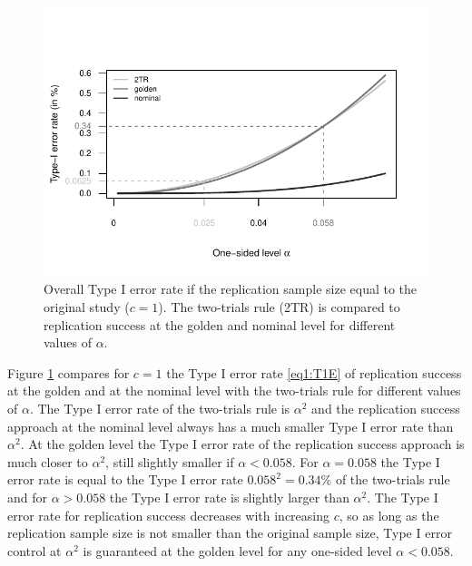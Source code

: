 \begin{figure}[!ht]
\begin{center}

\begin{knitrout}
\color{fgcolor}

{\centering \includegraphics[width=\maxwidth]{images/paper1/fig5-1}

}


\end{knitrout}

\end{center}
\caption{Overall Type I error rate if the replication sample size equal to the
  original study ($c=1$). The two-trials rule (2TR) is compared to replication
  success at the golden and nominal level for different values of $\alpha$.}
\label{fig1:fig5}
\end{figure}

Figure \ref{fig1:fig5} compares for $c=1$ the Type I error rate \eqref{eq1:T1E} of
replication success at the golden and at the nominal level with the two-trials
rule for different values of $\alpha$. The Type I error rate of the two-trials
rule is $\alpha^2$ and the replication success approach at the nominal level
always has a much smaller Type I error rate than $\alpha^2$. At the golden level
the Type I error rate of the replication success approach is much closer to
$\alpha^2$, still slightly smaller if $\alpha < 0.058$. For $\alpha = 0.058$ the
Type I error rate is equal to the Type I error rate $0.058^2 = 0.34\%$ of the
two-trials rule and for $\alpha > 0.058$ the Type I error rate is slightly
larger than $\alpha^2$. The Type I error rate for replication success decreases
with increasing $c$, so as long as the replication sample size is not smaller
than the original sample size, Type I error control at $\alpha^2$ is guaranteed
at the golden level for any one-sided level $\alpha < 0.058$.

